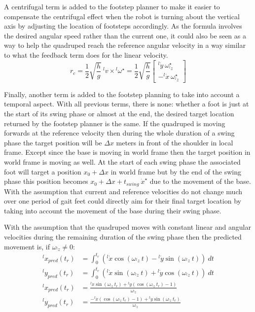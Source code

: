 \documentclass[a4paper,11pt]{article}
\begin{document}
A centrifugal term is added to the footstep planner to make it easier to compensate the centrifugal effect when the robot is turning about the vertical axis by adjusting the location of footsteps accordingly. As the formula involves the desired angular speed rather than the current one, it could also be seen as a way to help the quadruped reach the reference angular velocity in a way similar to what the feedback term does for the linear velocity.
\begin{equation}
{r}_{c} = \frac{1}{2} \sqrt{\frac{h}{g}} ~ {}^l\!v \times {}^l\!\omega^\star = \frac{1}{2} \sqrt{\frac{h}{g}} \begin{bmatrix} {}^l\!\dot y ~ \omega_{{}^l\!z}^\star \\ - {}^l\!\dot x ~ \omega_{{}^l\!z}^\star \end{bmatrix}
\end{equation}

Finally, another term is added to the footstep planning to take into account a temporal aspect. With all previous terms, there is none: whether a foot is just at the start of its swing phase or almost at the end, the desired target location returned by the footstep planner is the same. If the quadruped is moving forwards at the reference velocity then during the whole duration of a swing phase the target position will be $\Delta x$ meters in front of the shoulder in local frame. Except since the base is moving in world frame then the target position in world frame is moving as well. At the start of each swing phase the associated foot will target a position $x_0 + \Delta x$ in world frame but by the end of the swing phase this position becomes $x_0 + \Delta x + t_{swing} ~ \dot x^\star$ due to the movement of the base. With the assumption that current and reference velocities do not change much over one period of gait feet could directly aim for their final target location by taking into account the movement of the base during their swing phase.

With the assumption that the quadruped moves with constant linear and angular velocities during the remaining duration of the swing phase then the predicted movement is, if $\omega_{{}^l\!z} \neq 0$:
\begin{align}
{}^l\!x_{pred}(t_r) &= \int_{0}^{t_r} \left( {}^l\!\dot x \cos(\omega_{{}^l\!z} ~ t) - {}^l\!\dot y \sin(\omega_{{}^l\!z} ~ t) \right) ~dt \\
{}^l\!y_{pred}(t_r) &= \int_{0}^{t_r} \left( {}^l\!\dot x \sin(\omega_{{}^l\!z} ~ t) + {}^l\!\dot y \cos(\omega_{{}^l\!z} ~ t) \right) ~dt \\
{}^l\!x_{pred}(t_r) &= \frac{{}^l\!\dot x \sin(\omega_{{}^l\!z} ~ t_r) + {}^l\!\dot y \left( \cos(\omega_{{}^l\!z} ~ t_r) - 1 \right)}{\omega_{{}^l\!z}} \\
{}^l\!y_{pred}(t_r) &= \frac{- {}^l\!\dot x \left( \cos(\omega_{{}^l\!z} ~ t_r) - 1 \right) + {}^l\!\dot y \sin(\omega_{{}^l\!z} ~ t_r)}{\omega_{{}^l\!z}}
\end{align}
\end{document}

